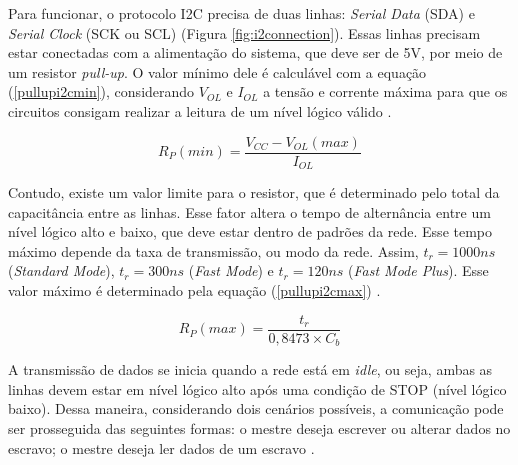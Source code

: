 Para funcionar, o protocolo I2C precisa de duas linhas: \textit{Serial Data} (SDA) e \textit{Serial Clock} (SCK ou SCL) (Figura \ref{fig:i2connection}). Essas linhas precisam estar conectadas com a alimentação do sistema, que deve ser de 5V, por meio de um resistor \textit{pull-up}. O valor mínimo dele é calculável com a equação (\ref{pullupi2cmin}), considerando $ V_{OL} $ e $ I_{OL} $ a tensão e corrente máxima para que os circuitos consigam realizar a leitura de um nível lógico válido \cite{man:texasI2Cpullup}. 

\begin{equation}
	R_P(min) = \dfrac{ V_{CC} - V_{OL}(max) }{I_{OL}}
	\label{pullupi2cmin}
\end{equation}

Contudo, existe um valor limite para o resistor, que é determinado pelo total da capacitância entre as linhas. Esse fator altera o tempo de alternância entre um nível lógico alto e baixo, que deve estar dentro de padrões da rede. Esse tempo máximo depende da taxa de transmissão, ou modo da rede. Assim, $ t_r=1000ns  $ (\textit{Standard Mode}), $ t_r=300ns $ (\textit{Fast Mode}) e $ t_r=120ns  $ (\textit{Fast Mode Plus}). Esse valor máximo é determinado pela equação (\ref{pullupi2cmax}) \cite{man:texasI2Cpullup}.

\begin{equation}
	R_P(max) = \dfrac{ t_r }{0,8473 \times C_b}
	\label{pullupi2cmax}
\end{equation}

A transmissão de dados se inicia quando a rede está em \textit{idle}, ou seja, ambas as linhas devem estar em nível lógico alto após uma condição de STOP (nível lógico baixo). Dessa maneira, considerando dois cenários possíveis, a comunicação pode ser prosseguida das seguintes formas: o mestre deseja escrever ou alterar dados no escravo; o mestre deseja ler dados de um escravo \cite{man:texasI2C}.

